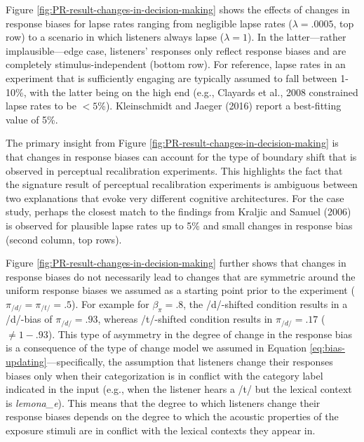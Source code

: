 \documentclass[
  11pt,
  english,
  man,floatsintext]{apa6}
\begin{document}
Figure \ref{fig:PR-result-changes-in-decision-making} shows the effects of changes in response biases for lapse rates ranging from negligible lapse rates (\(\lambda = .0005\), top row) to a scenario in which listeners always lapse (\(\lambda = 1\)). In the latter---rather implausible---edge case, listeners' responses only reflect response biases and are completely stimulus-independent (bottom row). For reference, lapse rates in an experiment that is sufficiently engaging are typically assumed to fall between 1-10\%, with the latter being on the high end (e.g., Clayards et al., 2008 constrained lapse rates to be \(<5\)\%). Kleinschmidt and Jaeger (2016) report a best-fitting value of 5\%.

The primary insight from Figure \ref{fig:PR-result-changes-in-decision-making} is that changes in response biases can account for the type of boundary shift that is observed in perceptual recalibration experiments. This highlights the fact that the signature result of perceptual recalibration experiments is ambiguous between two explanations that evoke very different cognitive architectures. For the case study, perhaps the closest match to the findings from Kraljic and Samuel (2006) is observed for plausible lapse rates up to 5\% and small changes in response bias (second column, top rows).

Figure \ref{fig:PR-result-changes-in-decision-making} further shows that changes in response biases do not necessarily lead to changes that are symmetric around the uniform response biases we assumed as a starting point prior to the experiment (\(\pi_{/d/}=\pi_{/t/}=.5\)). For example for \(\beta_{\pi} = .8\), the /d/-shifted condition results in a /d/-bias of \(\pi_{/d/}=.93\), whereas /t/-shifted condition results in \(\pi_{/d/}=.17\) (\(\neq 1 - .93\)). This type of asymmetry in the degree of change in the response bias is a consequence of the type of change model we assumed in Equation \eqref{eq:bias-updating}---specifically, the assumption that listeners change their responses biases only when their categorization is in conflict with the category label indicated in the input (e.g., when the listener hears a /t/ but the lexical context is \emph{lemona\_e}). This means that the degree to which listeners change their response biases depends on the degree to which the acoustic properties of the exposure stimuli are in conflict with the lexical contexts they appear in.
\end{document}
